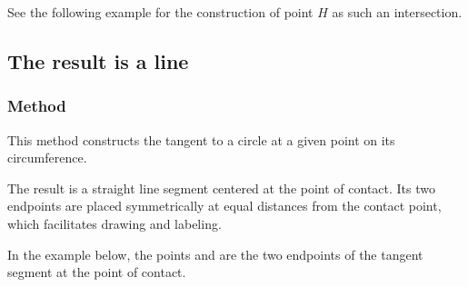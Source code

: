 \medskip
\noindent
See the following example for the construction of point $H$ as such an intersection.

\vspace{1em}



\begin{tkzexample}[latex=.5\textwidth]
\begin{center}
\end{center}
\end{tkzexample}






\subsection{The result is a line} %

\subsubsection{Method } %
\label{ssub:method_circle_tangent__at_pt}

This method constructs the tangent to a circle at a given point on its circumference.

\medskip
\noindent
The result is a straight line segment centered at the point of contact. Its two endpoints are placed symmetrically at equal distances from the contact point, which facilitates drawing and labeling.

\medskip
\noindent
In the example below, the points  and  are the two endpoints of the tangent segment at the point of contact.

